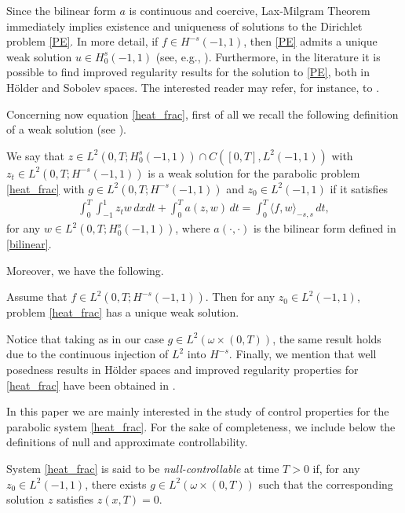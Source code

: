 Since the bilinear form $a$ is continuous and coercive, Lax-Milgram Theorem immediately implies existence and uniqueness of solutions to the Dirichlet problem \eqref{PE}. In more detail, if $f\in H^{-s}(-1,1)$, then \eqref{PE} admits a unique weak solution $u\in H_0^s(-1,1)$ (see, e.g., \cite[Proposition 2.1]{biccari2017local}). Furthermore, in the literature it is possible to find improved regularity results for the solution to \eqref{PE}, both in H\"older and Sobolev spaces. The interested reader may refer, for instance, to \cite{acosta2017fractional,biccari2017local,leonori2015basic,ros2014dirichlet,ros2014extremal}.

Concerning now equation \eqref{heat_frac}, first of all we recall the following definition of a weak solution (see \cite[Definition 25]{leonori2015basic}).
\begin{definition} 
We say that $z\in L^2(0,T;H_0^s(-1,1))\cap C([0,T],L^2(-1,1))$ with $z_t\in L^2(0,T;H^{-s}(-1,1))$ is a weak solution for the parabolic problem \eqref{heat_frac} with $g\in L^2(0,T;H^{-s}(-1,1))$ and $z_0\in L^2(-1,1)$ if it satisfies
\begin{align*}
	\int_0^T\int_{-1}^1 z_tw\,dxdt + \int_0^T a(z,w)\,dt = \int_0^T \langle f,w\rangle_{-s,s}\,dt,
\end{align*}
for any $w\in L^2(0,T;H_0^s(-1,1))$, where $a(\cdot,\cdot)$ is the bilinear form defined in \eqref{bilinear}.
\end{definition}

Moreover, we have the following.

\begin{theorem}
Assume that $f\in L^2(0,T;H^{-s}(-1,1))$. Then for any $z_0\in L^2(-1,1)$, problem \eqref{heat_frac} has a unique weak solution.
\end{theorem}
Notice that taking as in our case $g\in L^2(\omega\times(0,T))$, the same result holds due to the continuous injection of $L^2$ into $H^{-s}$. Finally, we mention that well posedness results in H\"older spaces and improved regularity properties for \eqref{heat_frac} have been obtained in \cite{biccari2017parabolic,fernandez2016boundary}.  

In this paper we are mainly interested in the study of control properties for the parabolic system \eqref{heat_frac}. For the sake of completeness, we include below the definitions of null and approximate controllability.

\begin{definition}
System \eqref{heat_frac} is said to be \textit{null-controllable} at time $T>0$ if, for any $z_0\in L^2(-1,1)$, there exists $g\in L^2(\omega\times(0,T))$ such that the corresponding solution $z$ satisfies $z(x,T)=0$.
\end{definition}


